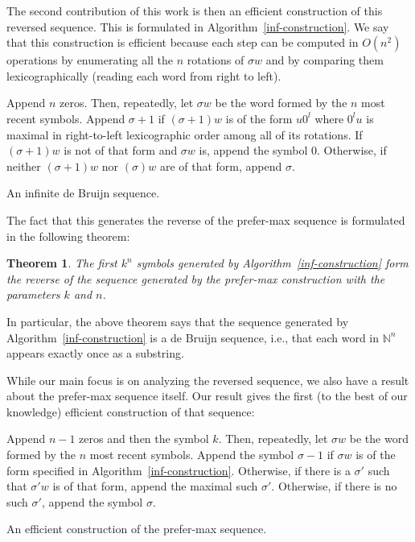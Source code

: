 \documentclass{article}
\newtheorem{theorem}{Theorem}
\theoremstyle{definition}
\newcommand{\N}{{\mathbb{N}}}
\begin{document}
The second contribution of this work is then an efficient construction of this reversed sequence. This is formulated in Algorithm~\ref{inf-construction}. We say that this construction is efficient because each step can be computed in $O(n^2)$ operations by enumerating all the $n$ rotations of $\sigma w$ and by comparing them lexicographically (reading each word from right to left).


\begin{algorithm}[!h]
	Append $n$ zeros. Then, repeatedly, let $\sigma w$ be the word formed by the $n$ most recent symbols. Append $\sigma+1$ if $(\sigma+1)w$ is of the form $u0^l$ where $0^lu$ is maximal in right-to-left lexicographic order among all of its rotations. If $(\sigma+1)w$ is not of that form and $\sigma w$ is, append the symbol $0$. Otherwise, if neither $(\sigma+1)w$ nor $(\sigma)w$ are of that form, append $\sigma$.
	\caption{An infinite de Bruijn sequence.}
	\label{inf-construction}
\end{algorithm}

The fact that this generates the reverse of the prefer-max sequence is formulated in the following theorem:
 
\begin{theorem} 
The first $k^n$ symbols generated by Algorithm~\ref{inf-construction} form the reverse of the sequence generated by the prefer-max construction with the parameters $k$ and $n$.	
\end{theorem} 

In particular, the above theorem says that the sequence generated by Algorithm~\ref{inf-construction} is a de Bruijn sequence, i.e., that each word in $\N^n$ appears exactly once as a substring.

While our main focus is on analyzing the reversed sequence, we also have a result about the prefer-max sequence itself. Our result gives the first (to the best of our knowledge) efficient construction of that sequence:

\begin{algorithm}
	Append $n-1$ zeros and then the symbol $k$. Then, repeatedly, let $\sigma w$ be the word formed by the $n$ most recent symbols. Append the symbol $\sigma-1$  if $\sigma w$  is of the form specified in Algorithm~\ref{inf-construction}. Otherwise, if there is a  $\sigma'$ such that $\sigma'w$ is of that form, append the maximal such $\sigma'$. Otherwise, if there is no such $\sigma'$, append the symbol $\sigma$.
		
	\caption{An efficient construction of the prefer-max sequence.}
	\label{efficient-pref-max}
\end{algorithm}
\end{document}
